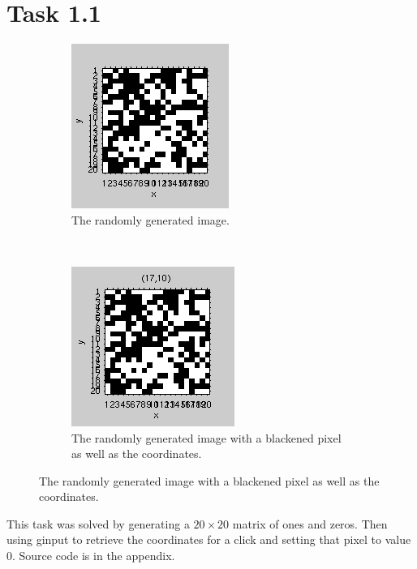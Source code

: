 \section{Task 1.1}
\begin{figure}[h]
  \centering
  \begin{subfigure}[t]{0.3\textwidth}
    \includegraphics[width=\textwidth]{img/1_1_before.png}
    \caption{The randomly generated image.}
    \label{fig:1_1_before}
  \end{subfigure}%
  ~
  \begin{subfigure}[t]{0.3\textwidth}
    \includegraphics[width=\textwidth]{img/1_1_after.png}
    \caption{The randomly generated image with a blackened pixel as well as the
      coordinates.}
    \label{fig:1_1_after}
  \end{subfigure}
\end{figure}

This task was solved by generating a $20\times 20$ matrix of ones and
zeros. Then using ginput to retrieve the coordinates for a click and setting
that pixel to value $0$. Source code is in the appendix.
